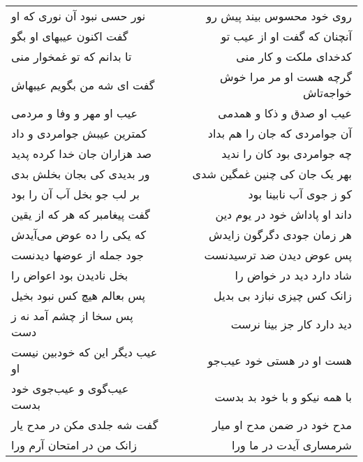 \begin{center}
\begin{longtable}{l p{0.5cm} r}
نور حسی نبود آن نوری که او
&&
روی خود محسوس بیند پیش رو
\\
گفت اکنون عیبهای او بگو
&&
آنچنان که گفت او از عیب تو
\\
تا بدانم که تو غمخوار منی
&&
کدخدای ملکت و کار منی
\\
گفت ای شه من بگویم عیبهاش
&&
گرچه هست او مر مرا خوش خواجه‌تاش
\\
عیب او مهر و وفا و مردمی
&&
عیب او صدق و ذکا و همدمی
\\
کمترین عیبش جوامردی و داد
&&
آن جوامردی که جان را هم بداد
\\
صد هزاران جان خدا کرده پدید
&&
چه جوامردی بود کان را ندید
\\
ور بدیدی کی بجان بخلش بدی
&&
بهر یک جان کی چنین غمگین شدی
\\
بر لب جو بخل آب آن را بود
&&
کو ز جوی آب نابینا بود
\\
گفت پیغامبر که هر که از یقین
&&
داند او پاداش خود در یوم دین
\\
که یکی را ده عوض می‌آیدش
&&
هر زمان جودی دگرگون زایدش
\\
جود جمله از عوضها دیدنست
&&
پس عوض دیدن ضد ترسیدنست
\\
بخل نادیدن بود اعواض را
&&
شاد دارد دید در خواض را
\\
پس بعالم هیچ کس نبود بخیل
&&
زانک کس چیزی نبازد بی بدیل
\\
پس سخا از چشم آمد نه ز دست
&&
دید دارد کار جز بینا نرست
\\
عیب دیگر این که خودبین نیست او
&&
هست او در هستی خود عیب‌جو
\\
عیب‌گوی و عیب‌جوی خود بدست
&&
با همه نیکو و با خود بد بدست
\\
گفت شه جلدی مکن در مدح یار
&&
مدح خود در ضمن مدح او میار
\\
زانک من در امتحان آرم ورا
&&
شرمساری آیدت در ما ورا
\\
\end{longtable}
\end{center}
